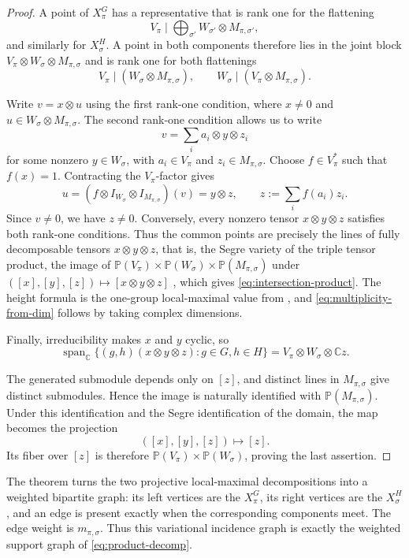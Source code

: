 \documentclass[10pt]{amsart}
\theoremstyle{remark}
\DeclareMathOperator{\Span}{span}
\newcommand{\C}{\mathbb C}
\newcommand{\PP}{\mathbb P}
\begin{document}
\begin{proof}
A point of $X_\pi^G$ has a representative that is rank one for the flattening
\[
 V_\pi\mid\bigoplus_{\sigma'} W_{\sigma'}\otimes M_{\pi,\sigma'},
\]
and similarly for $X_\sigma^H$. A point in both components therefore lies in the joint block
$V_\pi\otimes W_\sigma\otimes M_{\pi,\sigma}$ and is rank one for both flattenings
\[
 V_\pi\mid(W_\sigma\otimes M_{\pi,\sigma}),
 \qquad
 W_\sigma\mid(V_\pi\otimes M_{\pi,\sigma}).
\]

Write $v=x\otimes u$ using the first rank-one condition,
where $x\neq 0$ and $u\in W_\sigma\otimes M_{\pi,\sigma}$.
The second rank-one condition allows us to write
\[
 v=\sum_i a_i\otimes y\otimes z_i
\]
for some nonzero $y\in W_\sigma$, with
$a_i\in V_\pi$ and $z_i\in M_{\pi,\sigma}$.
Choose $f\in V_\pi^*$ such that $f(x)=1$.
Contracting the $V_\pi$-factor gives
\[
 u
 =
 (f\otimes I_{W_\sigma}\otimes I_{M_{\pi,\sigma}})(v)
 =
 y\otimes z,
 \qquad
 z:=\sum_i f(a_i)z_i.
\]
Since $v\neq 0$, we have $z\neq 0$.
Conversely, every nonzero tensor $x\otimes y\otimes z$
satisfies both rank-one conditions.
Thus the common points are precisely the lines of
fully decomposable tensors $x\otimes y\otimes z$, that is, the Segre variety of the triple tensor product,
the image of $\PP(V_\pi)\times\PP(W_\sigma)\times\PP(M_{\pi,\sigma})$ under
$([x],[y],[z])\mapsto[x\otimes y\otimes z]$ \cite{Landsberg}, which gives \eqref{eq:intersection-product}.
The height formula is the one-group local-maximal value from \cite[Theorem~3]{HungKang2026}, and
\eqref{eq:multiplicity-from-dim} follows by taking complex dimensions.

Finally, irreducibility makes $x$ and $y$ cyclic, so
\[
 \Span_{\C}\{(g,h)(x\otimes y\otimes z):g\in G,h\in H\}
 =V_\pi\otimes W_\sigma\otimes\C z.
\]

The generated submodule depends only on $[z]$,
and distinct lines in $M_{\pi,\sigma}$ give distinct submodules.
Hence the image is naturally identified with
$\mathbb{P}(M_{\pi,\sigma})$.
Under this identification and the Segre identification
of the domain, the map becomes the projection
\[
 ([x],[y],[z])\longmapsto[z].
\]
Its fiber over $[z]$ is therefore
$\mathbb{P}(V_\pi)\times\mathbb{P}(W_\sigma)$,
proving the last assertion.
\end{proof}

The theorem turns the two projective local-maximal decompositions into a weighted bipartite graph: its left
vertices are the $X_\pi^G$, its right vertices are the $X_\sigma^H$, and an edge is present exactly when the
corresponding components meet. The edge weight is $m_{\pi,\sigma}$. Thus this variational incidence graph
is exactly the weighted support graph of \eqref{eq:product-decomp}.
\end{document}
